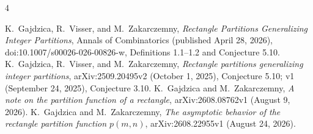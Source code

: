 \documentclass[11pt]{article}
\begin{document}
\begin{thebibliography}{4}
\raggedright
{} K.~Gajdzica, R.~Visser, and M.~Zakarczemny,
\emph{Rectangle Partitions Generalizing Integer Partitions},
Annals of Combinatorics (published April 28, 2026),
doi:10.1007/s00026-026-00826-w, Definitions 1.1--1.2 and Conjecture 5.10.
 K.~Gajdzica, R.~Visser, and M.~Zakarczemny,
\emph{Rectangle partitions generalizing integer partitions},
arXiv:2509.20495v2 (October 1, 2025), Conjecture 5.10;
v1 (September 24, 2025), Conjecture 3.10.
 K.~Gajdzica and M.~Zakarczemny,
\emph{A note on the partition function of a rectangle},
arXiv:2608.08762v1 (August 9, 2026).
 K.~Gajdzica and M.~Zakarczemny,
\emph{The asymptotic behavior of the rectangle partition function
$p(m,n)$}, arXiv:2608.22955v1 (August 24, 2026).
\end{thebibliography}
\end{document}
